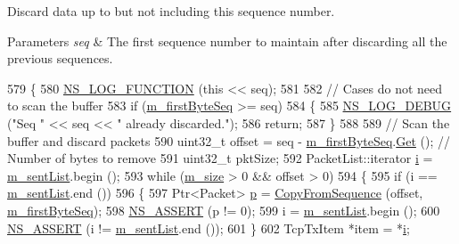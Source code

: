 Discard data up to but not including this sequence number. 


\begin{DoxyParams}{Parameters}
{\em seq} & The first sequence number to maintain after discarding all the previous sequences. \\
\hline
\end{DoxyParams}

\begin{DoxyCode}
579 \{
580   \hyperlink{log-macros-disabled_8h_a90b90d5bad1f39cb1b64923ea94c0761}{NS\_LOG\_FUNCTION} (\textcolor{keyword}{this} << seq);
581 
582   \textcolor{comment}{// Cases do not need to scan the buffer}
583   \textcolor{keywordflow}{if} (\hyperlink{classns3_1_1TcpTxBuffer_a46b67e5cb3396b43a41dd3fd5b135346}{m\_firstByteSeq} >= seq)
584     \{
585       \hyperlink{group__logging_ga413f1886406d49f59a6a0a89b77b4d0a}{NS\_LOG\_DEBUG} (\textcolor{stringliteral}{"Seq "} << seq << \textcolor{stringliteral}{" already discarded."});
586       \textcolor{keywordflow}{return};
587     \}
588 
589   \textcolor{comment}{// Scan the buffer and discard packets}
590   uint32\_t offset = seq - \hyperlink{classns3_1_1TcpTxBuffer_a46b67e5cb3396b43a41dd3fd5b135346}{m\_firstByteSeq}.\hyperlink{classns3_1_1TracedValue_a10fddd1de961ac65acfbeb440a1e8551}{Get} ();  \textcolor{comment}{// Number of bytes to remove}
591   uint32\_t pktSize;
592   PacketList::iterator \hyperlink{bernuolliDistribution_8m_a6f6ccfcf58b31cb6412107d9d5281426}{i} = \hyperlink{classns3_1_1TcpTxBuffer_ae131f4743f4537f3606db664874440e5}{m\_sentList}.begin ();
593   \textcolor{keywordflow}{while} (\hyperlink{classns3_1_1TcpTxBuffer_ace81d07d65ea00d9609dcc65a926564c}{m\_size} > 0 && offset > 0)
594     \{
595       \textcolor{keywordflow}{if} (i == \hyperlink{classns3_1_1TcpTxBuffer_ae131f4743f4537f3606db664874440e5}{m\_sentList}.end ())
596         \{
597           Ptr<Packet> \hyperlink{lte__link__budget_8m_ac9de518908a968428863f829398a4e62}{p} = \hyperlink{classns3_1_1TcpTxBuffer_a5eb9c889cfad2cd11a5ccf996c506fd3}{CopyFromSequence} (offset, 
      \hyperlink{classns3_1_1TcpTxBuffer_a46b67e5cb3396b43a41dd3fd5b135346}{m\_firstByteSeq});
598           \hyperlink{assert_8h_a6dccdb0de9b252f60088ce281c49d052}{NS\_ASSERT} (p != 0);
599           i = \hyperlink{classns3_1_1TcpTxBuffer_ae131f4743f4537f3606db664874440e5}{m\_sentList}.begin ();
600           \hyperlink{assert_8h_a6dccdb0de9b252f60088ce281c49d052}{NS\_ASSERT} (i != \hyperlink{classns3_1_1TcpTxBuffer_ae131f4743f4537f3606db664874440e5}{m\_sentList}.end ());
601         \}
602       TcpTxItem *item = *\hyperlink{bernuolliDistribution_8m_a6f6ccfcf58b31cb6412107d9d5281426}{i};

\end{DoxyCode}
